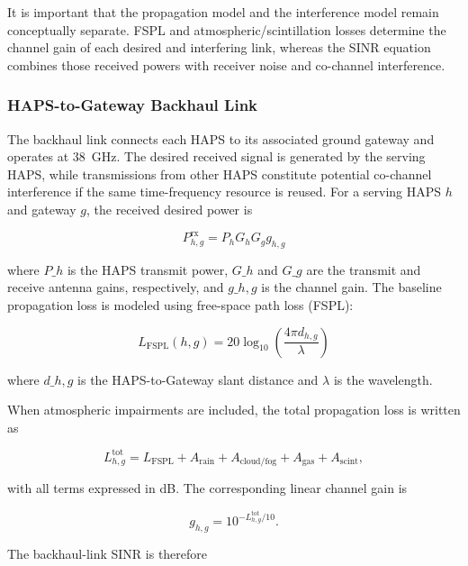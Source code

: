 \documentclass[conference]{IEEEtran}
\begin{document}
It is important that the propagation model and the interference model remain conceptually separate. FSPL and atmospheric/scintillation losses determine the channel gain of each desired and interfering link, whereas the SINR equation combines those received powers with receiver noise and co-channel interference.

\subsubsection{HAPS-to-Gateway Backhaul Link}

The backhaul link connects each HAPS to its associated ground gateway and operates at 38~GHz. The desired received signal is generated by the serving HAPS, while transmissions from other HAPS constitute potential co-channel interference if the same time-frequency resource is reused. For a serving HAPS $h$ and gateway $g$, the received desired power is

\begin{equation}
P_{h,g}^{\mathrm{rx}} = P_h G_h G_g g_{h,g}
\end{equation}



where $P\_h$ is the HAPS transmit power, $G\_h$ and $G\_g$ are the transmit and receive antenna gains, respectively, and $g\_{h,g}$ is the channel gain. The baseline propagation loss is modeled using free-space path loss (FSPL):

\begin{equation}
L_{\mathrm{FSPL}}(h,g)=20\log_{10}\left(\frac{4\pi d_{h,g}}{\lambda}\right)
\end{equation}

where $d\_{h,g}$ is the HAPS-to-Gateway slant distance and $\lambda$ is the wavelength.

When atmospheric impairments are included, the total propagation loss is written as

\begin{equation}
L_{h,g}^{\mathrm{tot}}
= L_{\mathrm{FSPL}}
+ A_{\mathrm{rain}}
+ A_{\mathrm{cloud/fog}}
+ A_{\mathrm{gas}}
+ A_{\mathrm{scint}},
\end{equation}

with all terms expressed in dB. The corresponding linear channel gain is

\begin{equation}
g_{h,g} = 10^{-L_{h,g}^{\mathrm{tot}}/10}.
\end{equation}

The backhaul-link SINR is therefore
\end{document}
